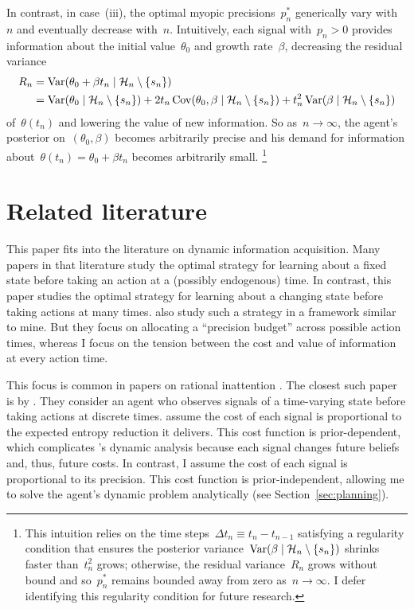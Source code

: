 \documentclass[11pt,oneside]{article}
\begin{document}
In contrast, in case~(iii), the optimal myopic precisions~$p_n^*$ generically vary with~$n$ and eventually decrease with~$n$.
Intuitively, each signal with~$p_n>0$ provides information about the initial value~$\theta_0$ and growth rate~$\beta$, decreasing the residual variance
%
\begin{align*}
    R_n
    &= \operatorname{Var}(\theta_0+\beta t_n\mid\mathcal{H}_n\setminus\{s_n\}) \\
    &= \operatorname{Var}(\theta_0\mid\mathcal{H}_n\setminus\{s_n\})+2t_n\operatorname{Cov}(\theta_0,\beta\mid\mathcal{H}_n\setminus\{s_n\})+t_n^2\operatorname{Var}(\beta\mid\mathcal{H}_n\setminus\{s_n\})
\end{align*}
%
of~$\theta(t_n)$ and lowering the value of new information.
So as~$n\to\infty$, the agent's posterior on~$(\theta_0,\beta)$ becomes arbitrarily precise and his demand for information about~$\theta(t_n)=\theta_0+\beta t_n$ becomes arbitrarily small.%
\footnote{
This intuition relies on the time steps~$\Delta t_n\equiv t_n-t_{n-1}$ satisfying a regularity condition that ensures the posterior variance~$\operatorname{Var}(\beta\mid\mathcal{H}_n\setminus\{s_n\})$ shrinks faster than~$t_n^2$ grows; otherwise, the residual variance~$R_n$ grows without bound and so~$p_n^*$ remains bounded away from zero as~$n\to\infty$.
I defer identifying this regularity condition for future research.
}

\section{Related literature}
\label{sec:literature}

This paper fits into the literature on dynamic information acquisition.
Many papers in that literature \citep[e.g.,][]{Bolton-Harris-1999-ECTA,Che-Mierendorff-2019-AER,Fudenberg-etal-2018-AER,Hebert-Woodford-2023-JET,Liang-etal-2018-,Liang-etal-2022-ECTA,Moscarini-Smith-2001-ECTA} study the optimal strategy for learning about a fixed state before taking an action at a (possibly endogenous) time.
In contrast, this paper studies the optimal strategy for learning about a changing state before taking actions at many times.
\cite{Immorlica-etal-2021-LeibnizInt.Proc.Inform.LIPIcs} also study such a strategy in a framework similar to mine.
But they focus on allocating a ``precision budget'' across possible action times, whereas I focus on the tension between the cost and value of information at every action time.

This focus is common in papers on rational inattention \citep{Caplin-Dean-2015-AER,Mackowiak-etal-2023-JEL,Sims-2003-JME}.
The closest such paper is by \cite{Steiner-etal-2017-ECTA}.
They consider an agent who observes signals of a time-varying state before taking actions at discrete times.
\citeauthor{Steiner-etal-2017-ECTA} assume the cost of each signal is proportional to the expected entropy reduction it delivers.
This cost function is prior-dependent, which complicates \citeauthor{Steiner-etal-2017-ECTA}'s dynamic analysis because each signal changes future beliefs and, thus, future costs.
In contrast, I assume the cost of each signal is proportional to its precision.
This cost function is prior-independent, allowing me to solve the agent's dynamic problem analytically (see Section~\ref{sec:planning}).
\end{document}
